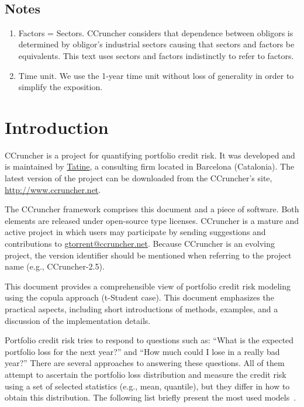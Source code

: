 \documentclass[11pt,fleqn]{book} %
\def\numversion{2.5}
\begin{document}
\glsaddall
\printglossary[style=super3colleft]
~\vfill
\section*{Notes}
\begin{enumerate}[leftmargin=*]
	\itemsep 0.5em
	\item Factors = Sectors. CCruncher considers that dependence between 
	obligors is determined by obligor's industrial sectors causing that 
	sectors and factors be equivalents. This text uses sectors and factors 
	indistinctly to refer to factors.
	\item Time unit. We use the 1-year time unit without loss of generality 
	in order to simplify the exposition.
\end{enumerate}
\cleardoublepage


\chapter{Introduction}

CCruncher is a project for quantifying portfolio credit risk. 
It was developed and is maintained by \href{http://www.tatine.es}{Tatine}, a 
consulting firm located in Barcelona (Catalonia). The latest version 
of the project can be downloaded from the CCruncher's site, 
\url{http://www.ccruncher.net}.

The CCruncher framework comprises this document and a piece of software. 
Both elements are released under open-source type licenses. 
CCruncher is a mature and active project in which users may participate by 
sending suggestions and contributions to \href{mailto:gtorrent@ccruncher.net}
{gtorrent@ccruncher.net}. Because CCruncher is an evolving project, the version
identifier should be mentioned when referring to the project name 
(e.g., CCruncher-\numversion).

This document provides a comprehensible view of portfolio credit risk modeling 
using the copula approach (t-Student case). This document emphasizes the 
practical aspects, including short introductions of methods, examples, and 
a discussion of the implementation details. 

Portfolio credit risk tries to respond to questions such as: ``What is the 
expected portfolio loss for the next year?'' and ``How much could I 
lose in a really bad year?'' There are several approaches to answering these 
questions. All of them attempt to ascertain the portfolio loss distribution 
and measure the credit risk using a set of selected statistics (e.g., mean, 
quantile), but they differ in how to obtain this distribution. The following 
list briefly present the most used 
models~\cite{crouhy:2000,brereton:2012,mcneil:2003}\cite[chap. 2.4]{bluhm:2002}. 
\end{document}
